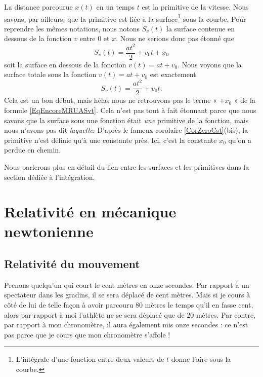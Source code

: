La distance parcourue \( x(t)\) en un temps \( t\) est la primitive de la vitesse. Nous savons, par ailleurs, que la primitive est liée à la surface\footnote{L'intégrale d'une fonction entre deux valeurs de \( t\) donne l'aire sous la courbe.} sous la courbe. Pour reprendre les mêmes notations, nous notons \( S_v(t)\) la surface contenue en dessous de la fonction \( v\) entre \( 0\) et \( x\). Nous ne serions donc pas étonné que
\begin{equation}        \label{EqEncoreMRUASvt}
	S_v(t) = \frac{ at^2 }{ 2 }+v_0t+x_0
\end{equation}
soit la surface en dessous de la fonction \( v(t)=at+v_0\). Nous voyons que la surface totale sous la fonction \( v(t)=at+v_0\) est exactement
\begin{equation}
	S_v(t)=\frac{ at^2 }{ 2 }+v_0t.
\end{equation}
Cela est un bon début, mais hélas nous ne retrouvons pas le terme « \( +x_0\) » de la formule \eqref{EqEncoreMRUASvt}. Cela n'est pas tout à fait étonnant parce que nous savons que la surface sous une fonction était \emph{une} primitive de la fonction, mais nous n'avons pas dit \emph{laquelle}. D'après le fameux corolaire \ref{CorZeroCst}(bis), la primitive n'est définie qu'à une constante près. Ici, c'est la constante \( x_0\) qu'on a perdue en chemin.

Nous parlerons plus en détail du lien entre les surfaces et les primitives dans la section dédiée à l'intégration.

\section{Relativité en mécanique newtonienne}

\subsection{Relativité du mouvement}

Prenons quelqu'un qui court le cent mètres en onze secondes. Par rapport à un spectateur dans les gradins, il se sera déplacé de cent mètres. Mais si je cours à côté de lui de telle façon à avoir parcouru \( 80\) mètres le temps qu'il en fasse cent, alors par rapport à moi l'athlète ne se sera déplacé que de \( 20\) mètres. Par contre, par rapport à mon chronomètre, il aura également mis onze secondes : ce n'est pas parce que je cours que mon chronomètre s'affole !

